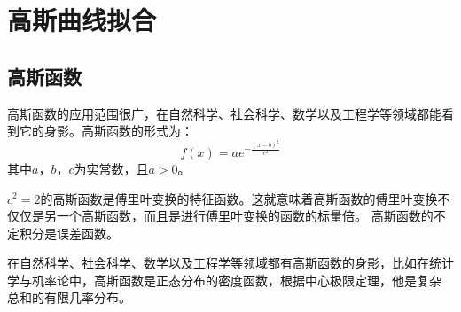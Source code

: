\section{高斯曲线拟合}
\subsection{高斯函数}
高斯函数的应用范围很广，在自然科学、社会科学、数学以及工程学等领域都能看到它的身影。高斯函数的形式为：
\begin{equation}
	f(x)=ae^{-\frac{(x-b)^2}{c^2}}
\end{equation}
其中$a$，$b$，$c$为实常数，且$a>0$。
\par  $c^2=2$的高斯函数是傅里叶变换的特征函数。这就意味着高斯函数的傅里叶变换不仅仅是另一个高斯函数，而且是进行傅里叶变换的函数的标量倍。
高斯函数的不定积分是误差函数。\par
在自然科学、社会科学、数学以及工程学等领域都有高斯函数的身影，比如在统计学与机率论中，高斯函数是正态分布的密度函数，根据中心极限定理，他是复杂
总和的有限几率分布。
